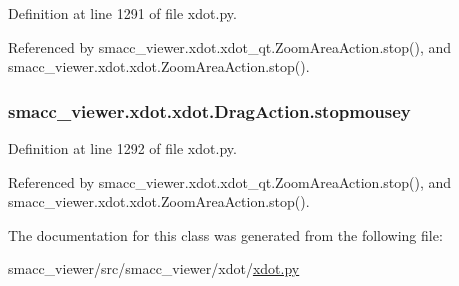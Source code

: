 Definition at line 1291 of file xdot.\+py.



Referenced by smacc\+\_\+viewer.\+xdot.\+xdot\+\_\+qt.\+Zoom\+Area\+Action.\+stop(), and smacc\+\_\+viewer.\+xdot.\+xdot.\+Zoom\+Area\+Action.\+stop().

\subsubsection[{\texorpdfstring{stopmousey}{stopmousey}}]{\setlength{\rightskip}{0pt plus 5cm}smacc\+\_\+viewer.\+xdot.\+xdot.\+Drag\+Action.\+stopmousey}\hypertarget{classsmacc__viewer_1_1xdot_1_1xdot_1_1DragAction_a19d174cf426a237cf98b607bc40b9b58}{}\label{classsmacc__viewer_1_1xdot_1_1xdot_1_1DragAction_a19d174cf426a237cf98b607bc40b9b58}


Definition at line 1292 of file xdot.\+py.



Referenced by smacc\+\_\+viewer.\+xdot.\+xdot\+\_\+qt.\+Zoom\+Area\+Action.\+stop(), and smacc\+\_\+viewer.\+xdot.\+xdot.\+Zoom\+Area\+Action.\+stop().



The documentation for this class was generated from the following file\+:\begin{DoxyCompactItemize}
\item 
smacc\+\_\+viewer/src/smacc\+\_\+viewer/xdot/\hyperlink{xdot_8py}{xdot.\+py}\end{DoxyCompactItemize}
